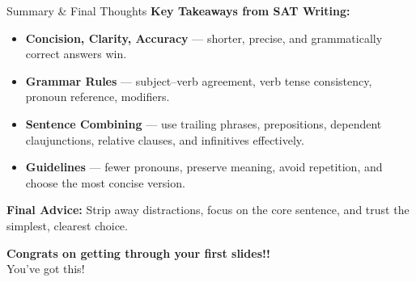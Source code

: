 \documentclass[aspectratio=169,11pt]{beamer}
\begin{document}
\begin{frame}{Summary \& Final Thoughts}
\small
\textbf{Key Takeaways from SAT Writing:}
\begin{itemize}
  \item \textbf{Concision, Clarity, Accuracy} — shorter, precise, and grammatically correct answers win.
  \item \textbf{Grammar Rules} — subject–verb agreement, verb tense consistency, pronoun reference, modifiers.
  \item \textbf{Sentence Combining} — use trailing phrases, prepositions, dependent claujunctions, relative clauses, and infinitives effectively.
  \item \textbf{Guidelines} — fewer pronouns, preserve meaning, avoid repetition, and choose the most concise version.
\end{itemize}

\vspace{0.6em}
\textbf{Final Advice:}  
Strip away distractions, focus on the core sentence, and trust the simplest, clearest choice.

\vspace{1em}
\centering
\Large \textbf{Congrats on getting through your first slides!!} \\
\large You’ve got this!
\end{frame}
\end{document}
